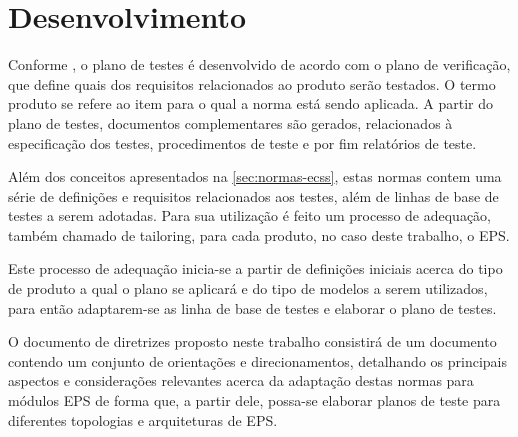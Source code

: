 \chapter{Desenvolvimento} \label{cap:desenvolvimento}


Conforme \textcite{ecss-e-st-10-03}, o plano de testes é desenvolvido de acordo com o plano de verificação, que define quais dos requisitos relacionados ao produto serão testados.
O termo produto se refere ao item para o qual a norma está sendo aplicada.
A partir do plano de testes, documentos complementares são gerados, relacionados à especificação dos testes, procedimentos de teste e por fim relatórios de teste.

Além dos conceitos apresentados na \autoref{sec:normas-ecss}, estas normas contem uma série de definições e requisitos relacionados aos testes, além de linhas de base de testes a serem adotadas.
Para sua utilização é feito um processo de adequação, também chamado de tailoring, para cada produto, no caso deste trabalho, o \gls{EPS}.

Este processo de adequação inicia-se a partir de definições iniciais acerca do tipo de produto a qual o plano se aplicará e do tipo de modelos a serem utilizados, para então adaptarem-se as linha de base de testes e elaborar o plano de testes.

O documento de diretrizes proposto neste trabalho consistirá de um documento contendo um conjunto de orientações e direcionamentos, detalhando os principais aspectos e considerações relevantes acerca da adaptação destas normas para módulos \gls{EPS} de forma que, a partir dele, possa-se elaborar planos de teste para diferentes topologias e arquiteturas de \gls{EPS}.






